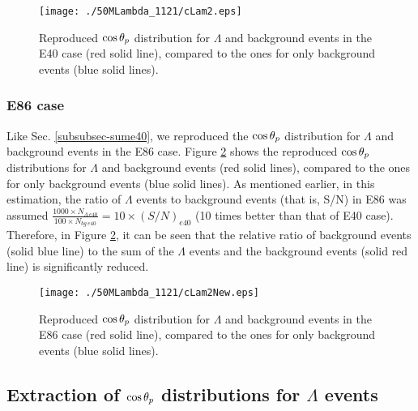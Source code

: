 \begin{figure}[h]
  \centering
  \texttt{[image: ./50MLambda\_1121/cLam2.eps]}
  \caption{Reproduced $\cos{\theta_p}$ distribution for $\Lambda$ and background events in the E40 case (red solid line), compared to the ones for only background events (blue solid lines).}
  \label{fig-cLam2}
\end{figure}

\subsubsection{E86 case}
Like Sec. \ref{subsubsec-sume40}, we reproduced the $\cos{\theta_p}$ distribution for $\Lambda$ and background events in the E86 case. Figure \ref{fig-cLam2New} shows the reproduced $\cos{\theta_p}$ distributions for $\Lambda$ and background events (red solid lines), compared to the ones for only background events (blue solid lines). As mentioned earlier, in this estimation, the ratio of $\Lambda$ events to background events (that is, S/N) in E86 was assumed $\frac{1000\times N_{\Lambda\ e40}}{100\times N_{bg\ e40}} = 10\times (S/N)_{e40}$ (10 times better than that of E40 case). Therefore, in Figure \ref{fig-cLam2New}, it can be seen that the relative ratio of background events (solid blue line) to the sum of the $\Lambda$ events and the background events (solid red line) is significantly reduced.

\begin{figure}[h]
  \centering
  \texttt{[image: ./50MLambda\_1121/cLam2New.eps]}
  \caption{Reproduced $\cos{\theta_p}$ distribution for $\Lambda$ and background events in the E86 case (red solid line), compared to the ones for only background events (blue solid lines).}
  \label{fig-cLam2New}
\end{figure}


\subsection{Extraction of $\cos{\theta_p}$ distributions for $\Lambda$ events}
\label{subsec-randext}

